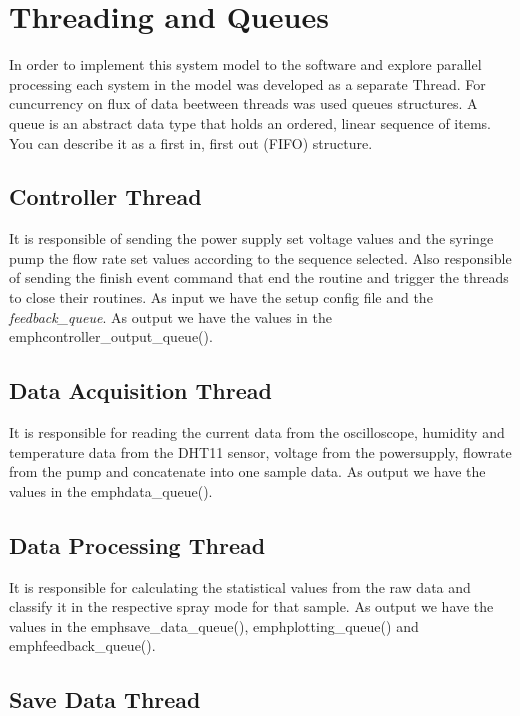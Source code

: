 \section{Threading and Queues}
\label{sec:concurrency}

    In order to implement this system model to the software and explore parallel processing each system in the
    model was developed as a separate Thread.
    For cuncurrency on flux of data beetween threads was used queues structures.
    A queue is an abstract data type that holds an ordered, linear sequence of items. You can describe it as a first in, first out (FIFO) structure.

    \subsection{Controller Thread}

        It is responsible of sending the power supply set voltage values and the syringe pump the flow rate set values according to the sequence selected.
        Also responsible of sending the finish event command that end the routine and trigger the threads to close their routines.
        As input we have the setup config file and the \emph{feedback\_queue}. As output we have the values in the emph{controller\_output\_queue()}.

    \subsection{Data Acquisition Thread}

        It is responsible for reading the current data from the oscilloscope, humidity and temperature data from the DHT11 sensor, voltage from the powersupply, flowrate from the pump and concatenate into one sample data.
        As output we have the values in the emph{data\_queue()}.

    \subsection{Data Processing Thread}

        It is responsible for calculating the statistical values from the raw data and classify it in the respective spray mode for that sample.
        As output we have the values in the emph{save\_data\_queue()}, emph{plotting\_queue()} and emph{feedback\_queue()}.
    
        \subsection{Save Data Thread}

